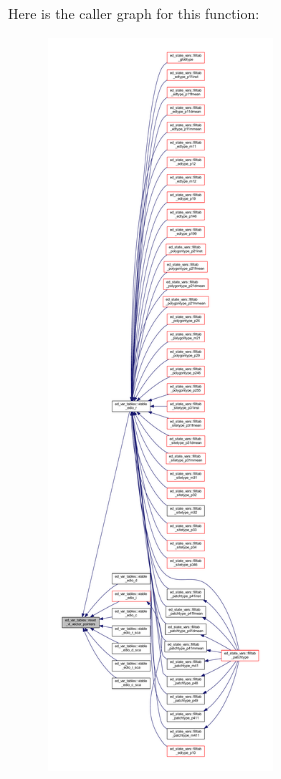 Here is the caller graph for this function\+:\nopagebreak
\begin{figure}[H]
\begin{center}
\leavevmode
\includegraphics[height=550pt]{namespaceed__var__tables_aed76c1293872b5f6cf4c39c0747d2bb4_icgraph}
\end{center}
\end{figure}



